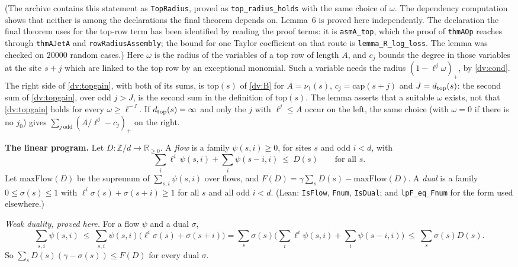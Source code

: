 \documentclass[11pt,letterpaper]{article}
\newcommand{\Z}{\mathbb Z}\newcommand{\Q}{\mathbb Q}\newcommand{\C}{\mathbb C}
\begin{document}
\noindent (The archive contains this statement as \texttt{TopRadius}, proved as
\texttt{top\_radius\_holds} with the same choice of $\omega$. The dependency computation shows that neither
is among the declarations the final theorem depends on. Lemma~6 is proved here independently. The declaration
the final theorem uses for the top-row term has been identified by reading the proof terms: it is \texttt{asmA\_top}, which the proof of \texttt{thmAOp} reaches through \texttt{thmAJetA} and \texttt{rowRadiusAssembly}; the bound for one Taylor coefficient on that route is \texttt{lemma\_R\_log\_loss}. The lemma was checked on
$20000$ random cases.) Here $\omega$ is the radius of the variables of a top row of length
$A$, and $c_j$ bounds the degree in those variables at the site $s+j$ which are linked to the top row by an
exceptional monomial. Such a variable needs the radius $(1-\ell^j\omega)_+$, by \eqref{dv:cond}. The
right side of \eqref{dv:topgain}, with both of its sums, is $\mathrm{top}(s)$ of \eqref{dv:B} for $A=\nu_1(s)$,
$c_j=\mathrm{cap}(s+j)$ and $J=d_{\rm top}(s)$: the second sum of \eqref{dv:topgain}, over odd $j>J$, is the
second sum in the definition of $\mathrm{top}(s)$. The lemma asserts that a suitable $\omega$ exists, not that
\eqref{dv:topgain} holds for every $\omega\ge\ell^{-J}$. If
$d_{\rm top}(s)=\infty$ and only the $j$ with $\ell^j\le A$ occur on the left, the same choice (with
$\omega=0$ if there is no $j_0$) gives $\sum_{j\ \mathrm{odd}}(A/\ell^j-c_j)_+$ on the right.

\textbf{The linear program.} Let $D:\Z/d\to\mathbb R_{\ge0}$. A \emph{flow} is a family $\psi(s,i)\ge0$, for
sites $s$ and odd $i<d$, with
\begin{equation}\label{dv:flow}
 \sum_{i}\ell^i\,\psi(s,i)+\sum_{i}\psi(s-i,i)\ \le\ D(s)\qquad\text{for all }s .
\end{equation}
Let $\mathrm{maxFlow}(D)$ be the supremum of $\sum_{s,i}\psi(s,i)$ over flows, and
$F(D)=\gamma\sum_sD(s)-\mathrm{maxFlow}(D)$. A \emph{dual} is a family $0\le\sigma(s)\le1$ with
$\ell^i\sigma(s)+\sigma(s+i)\ge1$ for all $s$ and all odd $i<d$. (Lean: \texttt{IsFlow}, \texttt{Fnum},
\texttt{IsDual}; and \texttt{lpF\_eq\_Fnum} for the form used elsewhere.)

\emph{Weak duality, proved here.} For a flow $\psi$ and a dual $\sigma$,
\begin{equation}\label{dv:weak}
 \sum_{s,i}\psi(s,i)\ \le\ \sum_{s,i}\psi(s,i)\big(\ell^i\sigma(s)+\sigma(s+i)\big)
 =\sum_s\sigma(s)\Big(\sum_i\ell^i\psi(s,i)+\sum_i\psi(s-i,i)\Big)\ \le\ \sum_s\sigma(s)D(s).
\end{equation}
So $\sum_sD(s)(\gamma-\sigma(s))\le F(D)$ for every dual $\sigma$.
\end{document}
